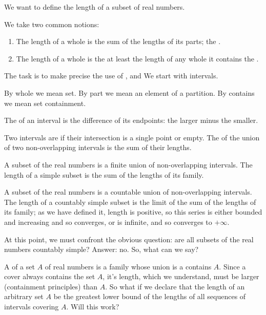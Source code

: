 
\sbasic

\sstart
{}


We want to define the length
of a subset of real numbers.


We take two common notions:

\begin{enumerate}

  \item
  The length of a whole
  is the sum of the lengths
  of its parts;
  the .

  \item
  The length of a whole
  is the at least the length
  of any whole it contains
  the .

\end{enumerate}

The task is to make precise
the use of
,
and 
We start with intervals.


By whole we mean set.
By part we mean an element
of a partition.
By contains we mean set
containment.

The
of an interval is the difference
of its endpoints: the larger minus
the smaller.

Two intervals are
if their intersection
is a single point or empty.
The  of the union of
two non-overlapping intervals is
the sum of their lengths.

A  subset
of the real numbers
is a finite union
of non-overlapping intervals.
The length of a simple subset
is the sum of the lengths of
its family.

A  subset
of the real numbers
is a countable union
of non-overlapping intervals.
The length of a countably simple subset
is the limit of the sum of the lengths
of its family; as we have defined it,
length is positive, so this series is either
bounded and increasing and so converges, or is
infinite, and so converges to $+\infty$.

At this point, we must confront the obvious
question: are all subsets of the real numbers
countably simple?
Answer: no.
So, what can we say?

A 
of a set $A$ of real numbers
is a family whose union
is a contains $A$.
Since a cover always contains
the set $A$, it's length, which
we understand, must be larger
(containment principles) than
$A$.
So what if we declare that
the length of an arbitrary set
$A$ be the greatest lower bound
of the lengths of all sequences
of intervals covering $A$.
Will this work?

